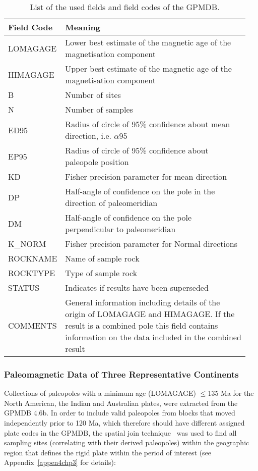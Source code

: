 \begin{table}
  \centering
  \caption{List of the used fields and field codes of the GPMDB.}\label{tab-fld}
  \begin{tabular}{p{0.16\linewidth} p{0.79\linewidth}}
    \toprule
    Field Code & Meaning \\ \midrule
    LOMAGAGE & Lower best estimate of the magnetic age of the magnetisation component \\
    HIMAGAGE & Upper best estimate of the magnetic age of the magnetisation component \\
    B & Number of sites \\
    N & Number of samples \\
    ED95 & Radius of circle of 95\% confidence about mean direction, i.e. $\alpha$95 \\
    EP95 & Radius of circle of 95\% confidence about paleopole position \\
    KD & Fisher precision parameter for mean direction \\
    DP & Half-angle of confidence on the pole in the direction of paleomeridian \\
    DM & Half-angle of confidence on the pole perpendicular to paleomeridian \\
    K\_NORM & Fisher precision parameter for Normal directions \\
    ROCKNAME & Name of sample rock \\
    ROCKTYPE & Type of sample rock \\
    STATUS & Indicates if results have been superseded \\
    COMMENTS & General information including details of the origin of LOMAGAGE
      and HIMAGAGE\@. If the result is a combined pole this field contains
      information on the data included in the combined result \\
    \bottomrule
  \end{tabular}
\end{table}

\subsubsection{Paleomagnetic Data of Three Representative Continents}

Collections of paleopoles with a minimum age (LOMAGAGE) $\leq$135 Ma for the
North American, the Indian and Australian plates, were extracted from the GPMDB
4.6b. In order to include valid paleopoles from blocks that moved independently
prior to 120 Ma, which therefore should have different assigned plate codes in
the GPMDB, the spatial join technique~\citep{J07} was used to find all sampling
sites (correlating with their derived paleopoles) within the geographic region
that defines the rigid plate within the period of interest (see
Appendix~\ref{appen4chp3} for details):

